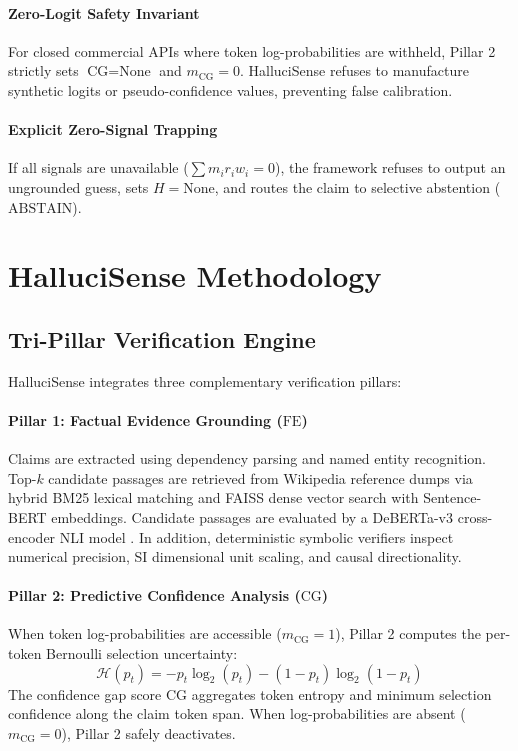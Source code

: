 \documentclass[conference]{IEEEtran}
\begin{document}
\paragraph{Zero-Logit Safety Invariant} For closed commercial APIs where token log-probabilities are withheld, Pillar 2 strictly sets $\text{CG} = \text{None}$ and $m_{\text{CG}} = 0$. HalluciSense refuses to manufacture synthetic logits or pseudo-confidence values, preventing false calibration.

\paragraph{Explicit Zero-Signal Trapping} If all signals are unavailable ($\sum m_i r_i w_i = 0$), the framework refuses to output an ungrounded guess, sets $H = \text{None}$, and routes the claim to selective abstention ($\text{ABSTAIN}$).

\section{HalluciSense Methodology}
\label{sec:methodology}

\subsection{Tri-Pillar Verification Engine}
HalluciSense integrates three complementary verification pillars:

\paragraph{Pillar 1: Factual Evidence Grounding ($\text{FE}$)}
Claims are extracted using dependency parsing and named entity recognition. Top-$k$ candidate passages are retrieved from Wikipedia reference dumps via hybrid BM25 lexical matching and FAISS dense vector search with Sentence-BERT embeddings. Candidate passages are evaluated by a DeBERTa-v3 cross-encoder NLI model \cite{he2021deberta}. In addition, deterministic symbolic verifiers inspect numerical precision, SI dimensional unit scaling, and causal directionality.

\paragraph{Pillar 2: Predictive Confidence Analysis ($\text{CG}$)}
When token log-probabilities are accessible ($m_{\text{CG}} = 1$), Pillar 2 computes the per-token Bernoulli selection uncertainty:
\begin{equation}
\mathcal{H}(p_t) = -p_t \log_2(p_t) - (1-p_t) \log_2(1-p_t)
\end{equation}
The confidence gap score $\text{CG}$ aggregates token entropy and minimum selection confidence along the claim token span. When log-probabilities are absent ($m_{\text{CG}} = 0$), Pillar 2 safely deactivates.
\end{document}

